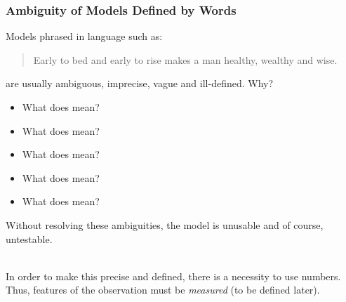 \documentclass[slides]{beamer} %
\begin{document}
\begin{frame}\frametitle{Ambiguity of Models Defined by Words}

\small
Models phrased in language such as:

\begin{quotation}
Early to bed and early to rise makes a man healthy, wealthy and wise.
\end{quotation}

are usually ambiguous, imprecise, vague and ill-defined. Why? \pause 

\begin{itemize}
\item What does  mean? 
\item What does  mean? 
\item What does  mean? 
\item What does  mean? 
\item What does  mean?
\end{itemize}

Without resolving these ambiguities, \pause the model is unusable and of course, untestable. \\~\\ \pause
\vspace{-0.3cm}

In order to make this precise and defined, there is a necessity to use numbers. \pause Thus, features of the observation must be \textit{measured} (to be defined later). \pause 
	
\end{frame}
\end{document}

